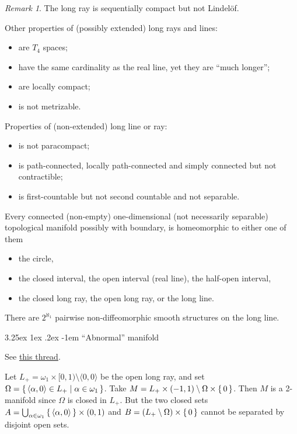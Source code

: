 \documentclass[12pt, letterpaper]{article}
\makeatletter
\renewcommand\subparagraph{\@startsection{subparagraph}{5}{\parindent}%
	{3.25ex \@plus1ex \@minus .2ex}%
	{0.75ex plus 0.1ex}%
	{\normalfont\normalsize\bfseries}}
\renewcommand\subparagraph{\@startsection{subparagraph}{5}{\parindent}%
	{3.25ex \@plus1ex \@minus .2ex}%
	{-1em}%
	{\normalfont\normalsize\bfseries}}
\theoremstyle{definition}
\theoremstyle{remark}
\newtheorem*{rem*}{Remark}
\theoremstyle{definition}
\theoremstyle{plain}
\numberwithin{equation}{section}
\makeatother
\begin{document}
	\begin{rem*}
		The long ray is sequentially compact but not Lindelöf.
		
		Other properties of (possibly extended) long rays and lines:
		\begin{itemize}
			\item are $T_4$ spaces;
			\item have the same cardinality as the real line, yet they are ``much longer'';
			\item are locally compact;
			\item is not metrizable.
		\end{itemize}
	
		Properties of (non-extended) long line or ray:
		\begin{itemize}
			\item is not paracompact;
			\item is path-connected, locally path-connected and simply connected but not contractible;
			\item is first-countable but not second countable and not separable.
		\end{itemize}
	
		Every connected (non-empty) one-dimensional (not necessarily separable) topological manifold possibly with boundary, is homeomorphic to
		either one of them
		\begin{itemize}
			\item the circle,
			\item the closed interval, the open interval (real line), the half-open interval,
			\item the closed long ray, the open long ray, or the long line.
		\end{itemize}
	
		There are $2^{\aleph_1}$ pairwise non-diffeomorphic smooth structures on the long line.
	\end{rem*}

	\subparagraph{``Abnormal'' manifold}
	
	See \href{https://mathoverflow.net/questions/149524/abnormal-manifold}{this thread}.
	
	Let $L_+=\omega_1\times[0,1)\setminus\langle0,0\rangle$ be the open long ray,
	and set $\Omega=\set{\langle\alpha,0\rangle\in L_+|\alpha\in\omega_1}$.
	Take $M=L_+\times(-1,1)\setminus\Omega\times\set{0}$.
	Then $M$ is a 2-manifold since $\Omega$ is closed in $L_+$.
	But the two closed sets $A=\bigcup_{\alpha\in\omega_1}\set{\langle\alpha,0\rangle}\times(0,1)$ and $B=(L_+\setminus\Omega)\times\set{0}$
	cannot be separated by disjoint open sets.
\end{document}
